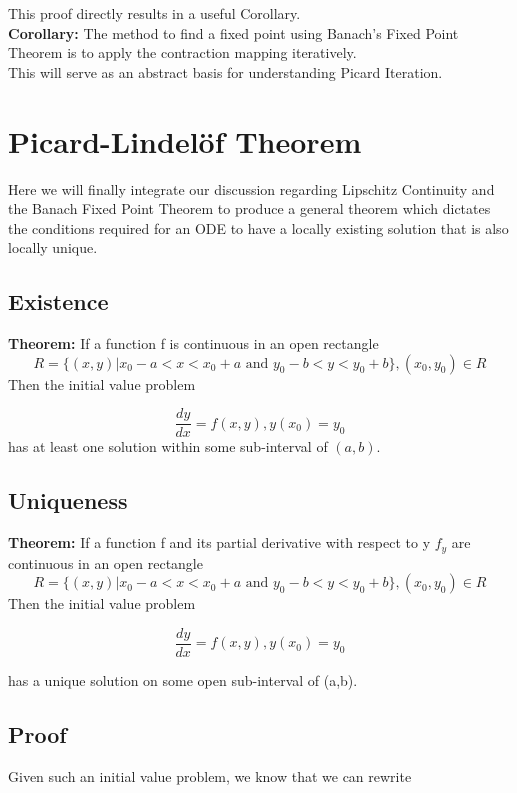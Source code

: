 \documentclass{article}
\begin{document}
This proof directly results in a useful Corollary.  \\
\textbf{Corollary:} The method to find a fixed point using Banach's Fixed Point Theorem is to apply the contraction mapping iteratively. \\

This will serve as an abstract basis for understanding Picard Iteration.

\section{Picard-Lindelöf Theorem}
Here we will finally integrate our discussion regarding Lipschitz Continuity and the Banach Fixed Point Theorem to produce a general theorem which dictates the conditions required for an ODE to have a locally existing solution that is also locally unique.

\subsection{Existence} 
\textbf{Theorem: }If a function f is continuous in an open rectangle
$$R = \{(x,y)| x_0-a<x<x_0+a \text{ and } y_0-b<y<y_0+b\}, (x_0, y_0) \in R$$
Then the initial value problem 

$$\frac{dy}{dx} = f(x,y), y(x_0) = y_0$$
has at least one solution within some sub-interval of $(a,b)$.



\subsection{Uniqueness} 

\textbf{Theorem: }If a function f and its partial derivative with respect to y $f_y$ are continuous in an open rectangle
$$R = \{(x,y)| x_0-a<x<x_0+a \text{ and } y_0-b<y<y_0+b\}, (x_0, y_0) \in R$$
Then the initial value problem 

$$\frac{dy}{dx} = f(x,y), y(x_0) = y_0$$

has a unique solution on some open sub-interval of (a,b).










\subsection{Proof}

Given such an initial value problem, we know that we can rewrite
\end{document}
